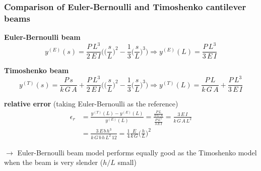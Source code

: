 \begin{frame}
  \frametitle{Comparison of Euler-Bernoulli and Timoshenko cantilever beams}
  
  \textbf{Euler-Bernoulli beam}
  \begin{displaymath}
    y^{(E)}(s) = \frac{P \, L^3}{2 \, E \, I} \Biggl( \biggl( \frac{s}{L} \biggr)^2 - \frac{1}{3} \biggl( \frac{s}{L} \biggr)^3 \Biggr)
    \Rightarrow y^{(E)}(L) = \frac{P \, L^3}{3 \, E \, I}
  \end{displaymath}
  
  \textbf{Timoshenko beam}
  \begin{displaymath}
    y^{(T)}(s) = \frac{P \, s}{k \, G \, A} + \frac{P \, L^3}{2 \, E \, I} \Biggl( 
      \biggl( \frac{s}{L} \biggr)^2 - \frac{1}{3} \biggl( \frac{s}{L} \biggr)^3 \Biggr)
      \Rightarrow y^{(T)}(L) = \frac{P \, L}{k \, G \, A} + \frac{P \, L^3}{3 \, E \, I}
  \end{displaymath}
  
  \textbf{relative error} (taking Euler-Bernoulli as the reference)
  \begin{displaymath}
    \begin{alignedat}{1}
      \epsilon_r &= \frac{y^{(T)}(L) - y^{(E)}(L)}{y^{(E)}(L)} = \frac{\frac{P \, L}{k \, G \, A}}{\frac{P \, L^3}{3 \, E \, I}} = \frac{3 \, E \, I}{k \, G \, A \, L^2} \\
      &= \frac{3 \, E \, b \, h^3}{k \, G \, b \, h \, L^2 \, 12} = \frac{1}{4} \frac{E}{k \, G} \biggl( \frac{h}{L} \biggr)^2
    \end{alignedat}
  \end{displaymath}
  
  \begin{center}
    $\rightarrow$ Euler-Bernoulli beam model performs equally good as the Timoshenko model \newline when the beam is very slender ($h/L$ small)
  \end{center}
\end{frame}


